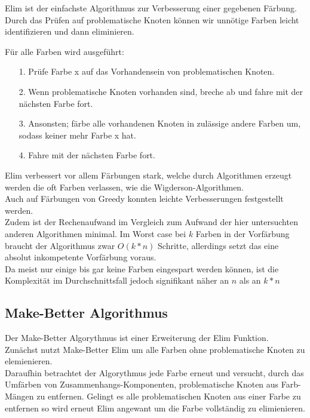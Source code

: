 \documentclass[11pt]{article}
\begin{document}
Elim ist der einfachste Algorithmus zur Verbesserung einer gegebenen Färbung. \\

Durch das Prüfen auf problematische Knoten können wir unnötige Farben leicht identifizieren und dann eliminieren.

Für alle Farben wird ausgeführt: \\
\begin{itemize}
\item[1.] Prüfe Farbe x auf das Vorhandensein von problematischen Knoten.
\item[2.] Wenn problematische Knoten vorhanden sind, breche ab und fahre mit der nächsten Farbe fort.
\item[3.] Ansonsten; färbe alle vorhandenen Knoten in zulässige andere Farben um, sodass keiner mehr Farbe x hat.
\item[4.] Fahre mit der nächsten Farbe fort.
\end{itemize}

Elim verbessert vor allem Färbungen stark, welche durch Algorithmen erzeugt werden die oft Farben verlassen, wie die Wigderson-Algorithmen. \\
Auch auf Färbungen von Greedy konnten leichte Verbesserungen festgestellt werden. \\
Zudem ist der Rechenaufwand im Vergleich zum Aufwand der hier untersuchten anderen Algorithmen minimal. Im Worst case bei $k$ Farben
in der Vorfärbung braucht der Algorithmus zwar $O(k*n)$ Schritte, allerdings setzt das eine absolut inkompetente Vorfärbung voraus. \\
Da meist nur einige bis gar keine Farben eingespart werden können, ist die Komplexität im Durchschnittsfall jedoch signifikant näher an $n$ als an $k*n$

\subsection{Make-Better Algorithmus} %

Der Make-Better Algorythmus ist einer Erweiterung der Elim Funktion. \\
Zunächst nutzt Make-Better Elim um alle Farben ohne problematische Knoten zu elemienieren. \\
Daraufhin betrachtet der Algorythmus jede Farbe erneut und versucht, durch das Umfärben von Zusammenhangs-Komponenten, problematische Knoten aus Farb-Mängen zu entfernen.
Gelingt es alle problematischen Knoten aus einer Farbe zu entfernen so wird erneut Elim angewant um die Farbe vollständig zu elimienieren. \\
\end{document}
